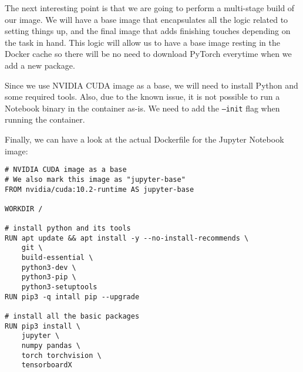 \documentclass{article}
\begin{document}
The next interesting point is that we are going to perform a multi-stage build of our image. 
We will have a base image that encapsulates all the logic related to setting things up, and the final image that adds finishing touches depending on the task in hand.
This logic will allow us to have a base image resting in the Docker cache so there will be no need to download PyTorch everytime when we add a new package.

Since we use NVIDIA CUDA image as a base, we will need to install Python and some required tools.
Also, due to the known issue, it is not possible to run a Notebook binary in the container as-is. We need to add the \texttt{--init} flag when running the container.

Finally, we can have a look at the actual Dockerfile for the Jupyter Notebook image:
\begin{verbatim}
# NVIDIA CUDA image as a base
# We also mark this image as "jupyter-base"
FROM nvidia/cuda:10.2-runtime AS jupyter-base

WORKDIR /

# install python and its tools
RUN apt update && apt install -y --no-install-recommends \
    git \
    build-essential \
    python3-dev \
    python3-pip \ 
    python3-setuptools
RUN pip3 -q intall pip --upgrade

# install all the basic packages
RUN pip3 install \ 
    jupyter \ 
    numpy pandas \
    torch torchvision \ 
    tensorboardX
\end{verbatim}
\end{document}
